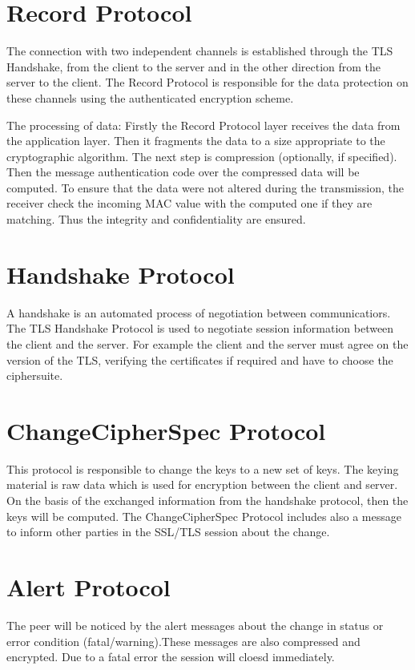 \section{Record Protocol}
\label{sec:record_protocol}

The connection with two independent channels is established through the TLS Handshake, from the client to the server and in the other direction from the server to the client. The Record Protocol is responsible for the data protection on these channels using the authenticated encryption scheme.

The processing of data:              
Firstly the Record Protocol layer receives the data from the application layer. Then it fragments the data to a size appropriate to the cryptographic algorithm. 
The next step is compression (optionally, if specified). Then the message authentication code over the compressed data will be computed.
To ensure that the data were not altered during the transmission, the receiver check the incoming MAC value with the computed one if they are matching. Thus the integrity and confidentiality are ensured.
\cite{ms:Record}

\section{Handshake Protocol}
\label{sec:handshake_protocol}
 A handshake is an automated process of negotiation between communicatiors. The TLS Handshake Protocol is used to negotiate session information between the client and the server. For example the client and the server must agree on the version of the TLS, verifying the certificates if required and have to choose the ciphersuite. 

\cite{ms:overview}
\cite{ms:handshake}

\section{ChangeCipherSpec Protocol}
\label{sec:changeciphfer_protocol}
This protocol is responsible to change the keys to a new set of keys. 
The keying material is raw data which is used for encryption between the client and server. On the basis of the exchanged information from the handshake protocol, then the keys will be computed.
The ChangeCipherSpec Protocol includes also a message to inform other parties in the SSL/TLS session about the change.   \cite{ms:overview}


\section{Alert Protocol}
\label{sec:alert_protocol}
The peer will be noticed by the alert messages about the change in status or error condition (fatal/warning).These messages are also compressed and encrypted. Due to a fatal error the session will cloesd immediately. 

